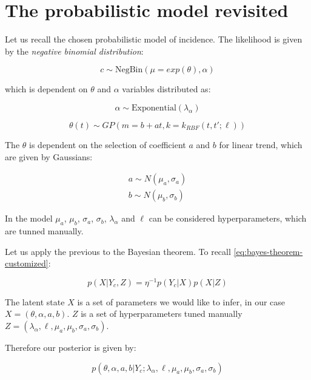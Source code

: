 \documentclass[
  digital, %
  oneside, %
  lof,     %
  lot,     %
]{fithesis4}
\begin{document}
\section{The probabilistic model revisited}

Let us recall the chosen probabilistic model of incidence.
The likelihood is given by the \textit{negative binomial distribution}:

\begin{equation}
  c \sim \text{NegBin} (\mu=exp(\theta), \alpha)
\end{equation}

which is dependent on $\theta$ and $\alpha$ variables distributed as:

\begin{equation}
  \alpha \sim \text{Exponential} (\lambda_\alpha)
\end{equation}

\begin{equation}
  \theta(t) \sim GP(m=b + at, k=k_{RBF} \left( t, t'; \ell \right))
\end{equation}

The $\theta$ is dependent on the selection of coefficient $a$ and $b$ for linear trend, which are given by Gaussians:

\begin{equation}
  \begin{split}
    a \sim N(\mu_a, \sigma_a) \\
    b \sim N(\mu_b, \sigma_b)
  \end{split}
\end{equation}

In the model $\mu_a$, $\mu_b$, $\sigma_a$, $\sigma_b$, $\lambda_\alpha$ and $\ell$ can be considered hyperparameters, which are tunned manually.

Let us apply the previous to the Bayesian theorem.
To recall \eqref{eq:bayes-theorem-customized}:

\begin{equation}
  p( X | Y_c, Z ) = \eta^{-1} p( Y_c | X ) p(X | Z)
\end{equation}

The latent state $X$ is a set of parameters we would like to infer, in our case $X = (\theta, \alpha, a, b)$.
$Z$ is a set of hyperparameters tuned manually $Z = (\lambda_\alpha, \ell, \mu_a, \mu_b, \sigma_a, \sigma_b)$.

Therefore our posterior is given by:

\begin{equation}
  p \left( \theta, \alpha, a, b | Y_c; \lambda_\alpha, \ell, \mu_a, \mu_b, \sigma_a, \sigma_b \right)
\end{equation}
\end{document}

